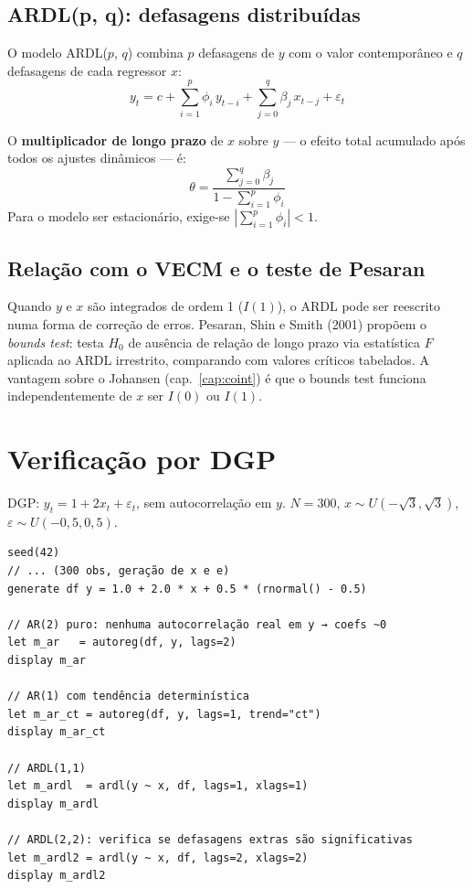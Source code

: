 \subsection*{ARDL(p, q): defasagens distribuídas}

O modelo ARDL($p$, $q$) combina $p$ defasagens de $y$ com o valor
contemporâneo e $q$ defasagens de cada regressor $x$:
\[
  y_t = c
        + \sum_{i=1}^p \phi_i\, y_{t-i}
        + \sum_{j=0}^q \beta_j\, x_{t-j}
        + \varepsilon_t
\]

O \textbf{multiplicador de longo prazo} de $x$ sobre $y$ — o efeito total
acumulado após todos os ajustes dinâmicos — é:
\[
  \theta = \frac{\sum_{j=0}^q \beta_j}{1 - \sum_{i=1}^p \phi_i}
\]
Para o modelo ser estacionário, exige-se $\left|\sum_{i=1}^p \phi_i\right| < 1$.

\subsection*{Relação com o VECM e o teste de Pesaran}

Quando $y$ e $x$ são integrados de ordem 1 ($I(1)$), o ARDL pode ser
reescrito numa forma de correção de erros. Pesaran, Shin e Smith (2001)
propõem o \emph{bounds test}: testa $H_0$ de ausência de relação de longo
prazo via estatística $F$ aplicada ao ARDL irrestrito, comparando com valores
críticos tabelados. A vantagem sobre o Johansen (cap.~\ref{cap:coint}) é que
o bounds test funciona independentemente de $x$ ser $I(0)$ ou $I(1)$.

\section{Verificação por DGP}

DGP: $y_t = 1 + 2x_t + \varepsilon_t$, sem autocorrelação em $y$.
$N = 300$, $x \sim U(-\sqrt{3}, \sqrt{3})$, $\varepsilon \sim U(-0{,}5, 0{,}5)$.

\begin{lstlisting}[caption={AutoReg e ARDL}]
seed(42)
// ... (300 obs, geração de x e e)
generate df y = 1.0 + 2.0 * x + 0.5 * (rnormal() - 0.5)

// AR(2) puro: nenhuma autocorrelação real em y → coefs ~0
let m_ar   = autoreg(df, y, lags=2)
display m_ar

// AR(1) com tendência determinística
let m_ar_ct = autoreg(df, y, lags=1, trend="ct")
display m_ar_ct

// ARDL(1,1)
let m_ardl  = ardl(y ~ x, df, lags=1, xlags=1)
display m_ardl

// ARDL(2,2): verifica se defasagens extras são significativas
let m_ardl2 = ardl(y ~ x, df, lags=2, xlags=2)
display m_ardl2
\end{lstlisting}

